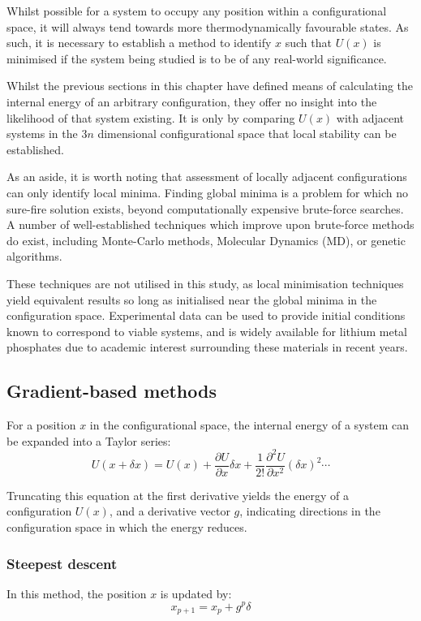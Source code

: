 Whilst possible for a system to occupy any position within a configurational space, it will always tend towards more thermodynamically favourable states.
As such, it is necessary to establish a method to identify $x$ such that $U(x)$ is minimised if the system being studied is to be of any real-world significance.

Whilst the previous sections in this chapter have defined means of calculating the internal energy of an arbitrary configuration, they offer no insight into the likelihood of that system existing.
It is only by comparing $U(x)$ with adjacent systems in the $3n$ dimensional configurational space that local stability can be established.


As an aside, it is worth noting that assessment of locally adjacent configurations can only identify local minima.
Finding global minima is a problem for which no sure-fire solution exists, beyond computationally expensive brute-force searches.
A number of well-established techniques which improve upon brute-force methods do exist, including Monte-Carlo methods,\cite{Allan2001} Molecular Dynamics (MD), or genetic algorithms. \cite{Barnes1992}

These techniques are not utilised in this study, as local minimisation techniques yield equivalent results so long as initialised near the global minima in the configuration space.
Experimental data can be used to provide initial conditions known to correspond to viable systems, and is widely available for lithium metal phosphates due to academic interest surrounding these materials in recent years.

\subsection{Gradient-based methods}

For a position $x$ in the configurational space, the internal energy of a system can be expanded into a Taylor series:
\begin{equation}
  U(x+\delta x) = U(x) + \frac{\partial U}{\partial x} \delta x + \frac{1}{2!} \frac{\partial ^2 U}{\partial x^2}(\delta x)^2 \cdots
\end{equation}

Truncating this equation at the first derivative yields the energy of a configuration $U(x)$, and a derivative vector $g$, indicating directions in the configuration space in which the energy reduces.

\subsubsection{Steepest descent}
In this method, the position $x$ is updated by:
\begin{equation}
x_{p+1} = x_p + g^p\delta
\end{equation}

